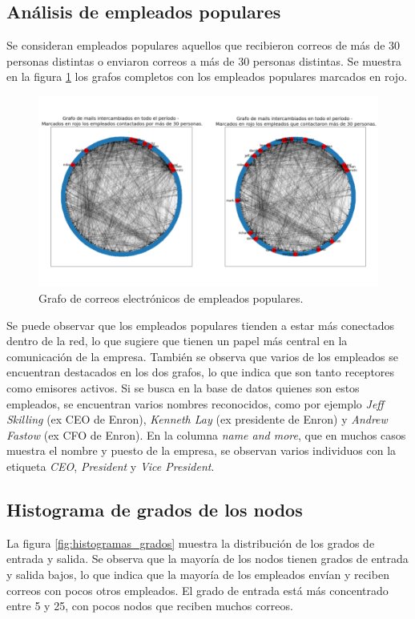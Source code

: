 \documentclass{article}
\begin{document}
\subsection{Análisis de empleados populares}
Se consideran empleados populares aquellos que recibieron correos de más de 30 personas distintas o enviaron correos a más de 30 personas distintas. Se muestra en la figura \ref{fig:grafos_populares} los grafos completos con los empleados populares marcados en rojo.

\begin{figure}[htb]
    \centering
    \includegraphics[width=0.8\linewidth]{imagenes/ej1/empleados_populares.png}
    \caption{Grafo de correos electrónicos de empleados populares.}
    \label{fig:grafos_populares}
\end{figure}

Se puede observar que los empleados populares tienden a estar más conectados dentro de la red, lo que sugiere que tienen un papel más central en la comunicación de la empresa. También se observa que varios de los empleados se encuentran destacados en los dos grafos, lo que indica que son tanto receptores como emisores activos. Si se busca en la base de datos quienes son estos empleados, se encuentran varios nombres reconocidos, como por ejemplo \textit{Jeff Skilling} (ex CEO de Enron), \textit{Kenneth Lay} (ex presidente de Enron) y \textit{Andrew Fastow} (ex CFO de Enron). En la columna \textit{name and more}, que en muchos casos muestra el nombre y puesto de la empresa, se observan varios individuos con la etiqueta \textit{CEO}, \textit{President} y \textit{Vice President}.

\subsection{Histograma de grados de los nodos}

La figura \ref{fig:histogramas_grados} muestra la distribución de los grados de entrada y salida. Se observa que la mayoría de los nodos tienen grados de entrada y salida bajos, lo que indica que la mayoría de los empleados envían y reciben correos con pocos otros empleados. El grado de entrada está más concentrado entre 5 y 25, con pocos nodos que reciben muchos correos.
\end{document}
